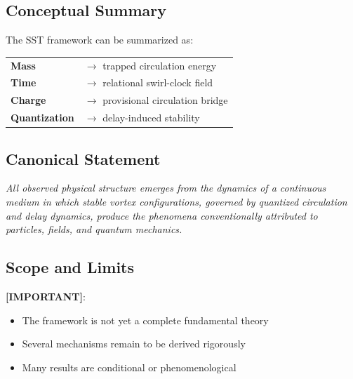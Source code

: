 \documentclass[11pt]{article}
\theoremstyle{definition}
\theoremstyle{plain}
\theoremstyle{remark}
\begin{document}
    \subsection{Conceptual Summary}
        
        The SST framework can be summarized as:
        
        \begin{center}
            \begin{tabular}{ll}
                \textbf{Mass} & $\rightarrow$ trapped circulation energy \\
                \textbf{Time} & $\rightarrow$ relational swirl-clock field \\
                \textbf{Charge} & $\rightarrow$ provisional circulation bridge \\
                \textbf{Quantization} & $\rightarrow$ delay-induced stability \\
            \end{tabular}
        \end{center}
    
    \subsection{Canonical Statement}
        
        \begin{center}
            \textit{
                All observed physical structure emerges from the dynamics of a continuous medium in which stable vortex configurations, governed by quantized circulation and delay dynamics, produce the phenomena conventionally attributed to particles, fields, and quantum mechanics.
            }
        \end{center}
    
    \subsection{Scope and Limits}
        
        \textbf{[IMPORTANT]}:
        
        \begin{itemize}
            \item The framework is not yet a complete fundamental theory
            \item Several mechanisms remain to be derived rigorously
            \item Many results are conditional or phenomenological
        \end{itemize}
    
\end{document}
